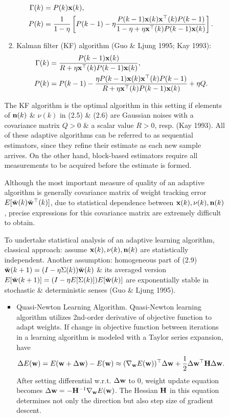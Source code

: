 \documentclass{article}
\begin{document}
\begin{enumerate}
\begin{itemize}
\begin{itemize}
\begin{enumerate}
\begin{align}
					\Gamma(k) &= P(k){\bf x}(k),\\
					P(k) &= \frac{1}{1 - \eta}\left[P(k - 1) - \eta\frac{P(k - 1){\bf x}(k){\bf x}^\top(k)P(k - 1)}{1 - \eta + \eta{\bf x}^\top(k)P(k - 1){\bf x}(k)}\right].
				\end{align}
				\item Kalman ﬁlter (KF) algorithm (Guo \& Ljung 1995; Kay 1993):
				\begin{align}
					\Gamma(k) &= \frac{P(k - 1){\bf x}(k)}{R + \eta{\bf x}^\top(k)P(k - 1){\bf x}(k)},\\
					P(k) &= P(k - 1) - \frac{\eta P(k - 1){\bf x}(k){\bf x}^\top(k)P(k - 1)}{R + \eta{\bf x}^\top(k)P(k - 1){\bf x}(k)} + \eta Q.
				\end{align}
			\end{enumerate}
			The KF algorithm is the optimal algorithm in this setting if elements of ${\bf n}(k)$ \& $\nu(k)$ in (2.5) \& (2.6) are Gaussian noises with a covariance matrix $Q > 0$ \& a scalar value $R > 0$, resp. (Kay 1993). All of these adaptive algorithms can be referred to as sequential estimators, since they refine their estimate as each new sample arrives. On the other hand, block-based estimators require all measurements to be acquired before the estimate is formed.
			
			Although the most important measure of quality of an adaptive algorithm is generally covariance matrix of weight tracking error $E[\breve{\bf w}(k)\breve{\bf w}^\top(k)]$, due to statistical dependence between ${\bf x}(k),\nu(k),{\bf n}(k)$, precise expressions for this covariance matrix are extremely difficult to obtain.
			
			To undertake statistical analysis of an adaptive learning algorithm, classical approach: assume ${\bf x}(k),\nu(k),{\bf n}(k)$ are statistically independent. Another assumption: homogeneous part of (2.9) $\breve{\bf w}(k + 1) = (I - \eta\Sigma(k))\breve{\bf w}(k)$ \& its averaged version $E[\breve{\bf w}(k + 1)] = (I - \eta E[\Sigma(k)])E[\breve{\bf w}(k)]$ are exponentially stable in stochastic \& deterministic senses (Guo \& Ljung 1995).
			\begin{itemize}
				\item {\sf Quasi-Newton Learning Algorithm.} Quasi-Newton learning algorithm utilizes 2nd-order derivative of objective function to adapt weights. If change in objective function between iterations in a learning algorithm is modeled with a Taylor series expansion, have
				\begin{equation}
					\Delta E({\bf w}) = E({\bf w} + \Delta{\bf w}) - E({\bf w})\approx(\nabla_{\bf w}E({\bf w}))^\top\Delta{\bf w} + \frac{1}{2}\Delta{\bf w}^\top{\bf H}\Delta{\bf w}.
				\end{equation}
				After setting differential w.r.t. $\Delta{\bf w}$ to 0, weight update equation becomes $\Delta{\bf w} = -{\bf H}^{-1}\nabla_{\bf w}E({\bf w})$. The Hessian ${\bf H}$ in this equation determines not only the direction but also step size of gradient descent.
				

\end{itemize}
\end{itemize}
\end{itemize}
\end{enumerate}
\end{document}
